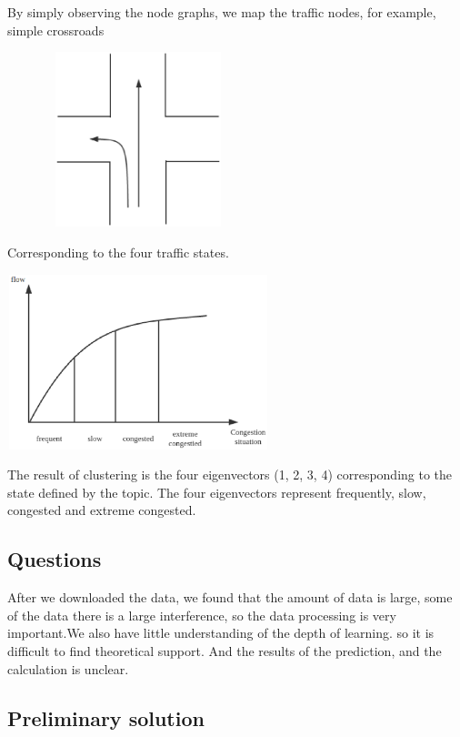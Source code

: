\documentclass[conference,compsoc]{appendix/report}
\begin{document}

\\
\\
By simply observing the node graphs, we map the traffic nodes, for example, simple crossroads

\includegraphics[width=3.00in,height=2.00in]{appendix/crossroads.eps}

Corresponding to the four traffic states.

\includegraphics[width=3.00in,height=2.00in]{appendix/states.eps}

The result of clustering is the four eigenvectors (1, 2, 3, 4) corresponding to the state defined by the topic. The four eigenvectors represent frequently, slow, congested and extreme congested.

\subsection{Questions}
After we downloaded the data, we found that the amount of data is large, some of the data there is a large interference, so the data processing is very important.We also have little understanding of the depth of learning. so it is difficult to find theoretical support.
And the results of the prediction, and the calculation is unclear.


\subsection{Preliminary solution}
\end{document}
